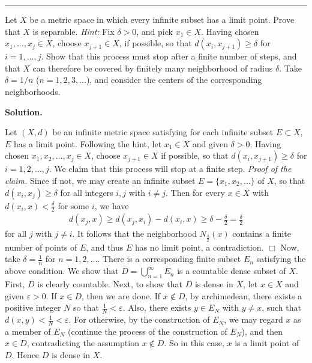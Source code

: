 \documentclass[12pt]{article}
\theoremstyle{definition}
\begin{document}
\bigskip\noindent\hrule\bigskip

Let $X$ be a metric space in which every infinite subset has a limit point. Prove that $X$ is separable. \textit{Hint:} Fix $\delta>0$, and pick $x_1\in X$. Having chosen $x_1,\ldots,x_j\in X$, choose $x_{j+1}\in X$, if possible, so that $d(x_i,x_{j+1})\ge\delta$ for $i=1,\ldots,j$. Show that this process must stop after a finite number of steps, and that $X$ can therefore be covered by finitely many neighborhood of radius $\delta$. Take $\delta=1/n$ ($n=1,2,3,\ldots$), and consider the centers of the corresponding neighborhoods.

\smallskip
\noindent\textbf{Solution.}\quad

Let $(X,d)$ be an infinite metric space satisfying for each infinite subset $E\subset X$, $E$ has a limit point. Following the hint, let $x_1\in X$ and given $\delta>0$. Having chosen $x_1,x_2,\ldots,x_j\in X$, choose $x_{j+1}\in X$ if possible, so that $d(x_i,x_{j+1})\ge\delta$ for $i=1,2,\ldots,j$. We claim that this process will stop at a finite step.
\textit{Proof of the claim.} Since if not, we may create an infinite subset $E=\{x_1,x_2,\ldots\}$ of $X$, so that $d(x_i,x_j)\ge\delta$ for all integers $i,j$ with $i\ne j$. Then for every $x\in X$ with $d(x_i,x)<\frac{\delta}{2}$ for some $i$, we have
\begin{align*}
d(x_j,x)\ge d(x_j,x_i)-d(x_i,x)\ge\delta-\frac{\delta}{2}=\frac{\delta}{2}
\end{align*}
for all $j$ with $j\ne i$. It follows that the neighborhood $N_{\tfrac{\delta}{2}}(x)$ contains a finite number of points of $E$, and thus $E$ has no limit point, a contradiction. $\Box$
Now, take $\delta=\frac{1}{n}$ for $n=1,2,\ldots$. There is a corresponding finite subset $E_n$ satisfying the above condition. We show that $D=\bigcup_{n=1}^\infty E_n$ is a countable dense subset of $X$. First, $D$ is clearly countable. Next, to show that $D$ is dense in $X$, let $x\in X$ and given $\varepsilon>0$. If $x\in D$, then we are done. If $x\notin D$, by archimedean, there exists a positive integer $N$ so that $\frac{1}{N}<\varepsilon$. Also, there exists $y\in E_N$ with $y\ne x$, such that $d(x,y)<\frac{1}{N}<\varepsilon$. For otherwise, by the construction of $E_N$, we may regard $x$ as a member of $E_N$ (continue the process of the construction of $E_N$), and then $x\in D$, contradicting the assumption $x\notin D$. So in this case, $x$ is a limit point of $D$. Hence $D$ is dense in $X$.
\end{document}
